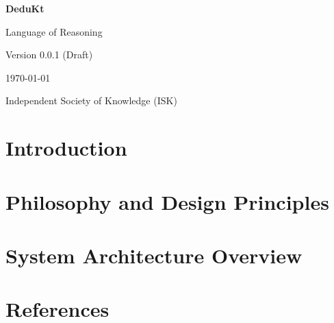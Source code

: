 \documentclass[11pt,oneside,a4paper]{book}
\theoremstyle{definition}
\theoremstyle{plain}
\theoremstyle{remark}
\begin{document}
    \begin{titlepage}
        \centering
        \vspace*{2cm}

        {\Huge\bfseries DeduKt \par}
        \vspace{1cm}
        {\Large Language of Reasoning \par}
        \vspace{2cm}

        {\Large Version 0.0.1 (Draft)\par}
        \vspace{0.5cm}
        {\large \today \par}

        \vfill

        {\Large Independent Society of Knowledge (ISK) \par}

    \end{titlepage}

    \tableofcontents


    
    \newpage
    
    \newpage
    
    \newpage
    
    \newpage
    
    \newpage
    
    \newpage
    

    \chapter{Introduction}\label{ch:introduction}
    
    
    
    
    
    

    \chapter{Philosophy and Design Principles}\label{ch:philosophy-and-design-principles}
    
    \chapter{System Architecture Overview}\label{ch:system-architecture-overview}
    


    \chapter{References}\label{ch:references}
    \printbibliography
\end{document}

